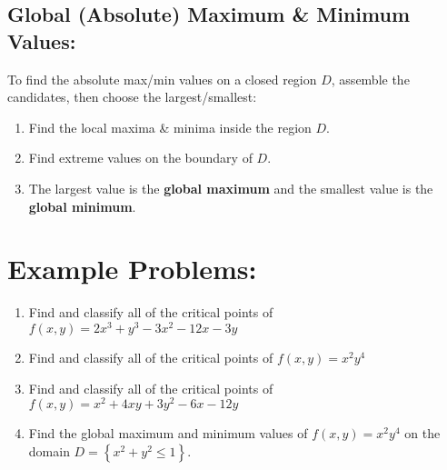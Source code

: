 \subsection*{Global (Absolute) Maximum \& Minimum Values:}
%
%
%
%
%
To find the absolute max/min values on a closed region \(D\), assemble the candidates, then choose the largest/smallest:
\begin{enumerate}
\item Find the local maxima \& minima inside the region \(D\).
\item Find extreme values on the boundary of \(D\).
\item The largest value is the \textbf{global maximum} and the smallest value is the \textbf{global minimum}.
\end{enumerate}






\pagebreak

\section*{Example Problems:}


\begin{enumerate}[{Example} 1: ]
\item Find and classify all of the critical points of \(f(x,y) = 2x^3+y^3-3x^2-12x-3y\)

\vfill

\item Find and classify all of the critical points of \(f(x,y) = x^2y^4\)

\vfill

\item Find and classify all of the critical points of \(f(x,y) = x^2+4xy+3y^2-6x-12y\)

\vfill

%
%
%

\item Find the global maximum and minimum values of \(f(x,y) = x^2y^4\) on the domain \(D=\left\lbrace x^2+y^2\leq 1\right\rbrace\).

\vfill

\end{enumerate}



